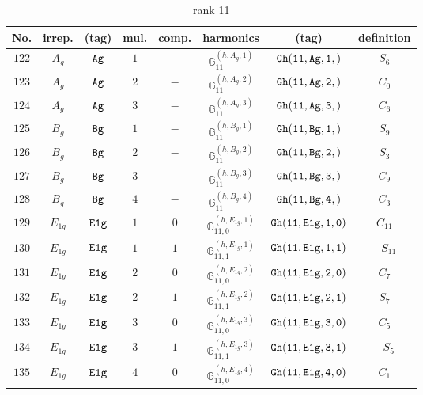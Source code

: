 \documentclass[fleqn,8pt]{jsarticle}
\begin{document}
\begin{table}[ht!]
\begin{center}
\caption{rank 11}
\renewcommand{\arraystretch}{1.3}
\begin{tabular}{cccccccc} \hline \hline
No. & irrep. & (tag) & mul. & comp. & harmonics & (tag) & definition \\ \hline
$ 122 $ & $ A_{g} $ & $ {\tt Ag} $ & $ 1 $ & $ - $ & $ \mathbb{G}_{11}^{(h,A_{g},1)} $ & $ {\tt Gh(11,Ag,1,)} $ & $ S_{6} $ \\
$ 123 $ & $ A_{g} $ & $ {\tt Ag} $ & $ 2 $ & $ - $ & $ \mathbb{G}_{11}^{(h,A_{g},2)} $ & $ {\tt Gh(11,Ag,2,)} $ & $ C_{0} $ \\
$ 124 $ & $ A_{g} $ & $ {\tt Ag} $ & $ 3 $ & $ - $ & $ \mathbb{G}_{11}^{(h,A_{g},3)} $ & $ {\tt Gh(11,Ag,3,)} $ & $ C_{6} $ \\
$ 125 $ & $ B_{g} $ & $ {\tt Bg} $ & $ 1 $ & $ - $ & $ \mathbb{G}_{11}^{(h,B_{g},1)} $ & $ {\tt Gh(11,Bg,1,)} $ & $ S_{9} $ \\
$ 126 $ & $ B_{g} $ & $ {\tt Bg} $ & $ 2 $ & $ - $ & $ \mathbb{G}_{11}^{(h,B_{g},2)} $ & $ {\tt Gh(11,Bg,2,)} $ & $ S_{3} $ \\
$ 127 $ & $ B_{g} $ & $ {\tt Bg} $ & $ 3 $ & $ - $ & $ \mathbb{G}_{11}^{(h,B_{g},3)} $ & $ {\tt Gh(11,Bg,3,)} $ & $ C_{9} $ \\
$ 128 $ & $ B_{g} $ & $ {\tt Bg} $ & $ 4 $ & $ - $ & $ \mathbb{G}_{11}^{(h,B_{g},4)} $ & $ {\tt Gh(11,Bg,4,)} $ & $ C_{3} $ \\
$ 129 $ & $ E_{1g} $ & $ {\tt E1g} $ & $ 1 $ & $ 0 $ & $ \mathbb{G}_{11,0}^{(h,E_{1g},1)} $ & $ {\tt Gh(11,E1g,1,0)} $ & $ C_{11} $ \\
$ 130 $ & $ E_{1g} $ & $ {\tt E1g} $ & $ 1 $ & $ 1 $ & $ \mathbb{G}_{11,1}^{(h,E_{1g},1)} $ & $ {\tt Gh(11,E1g,1,1)} $ & $ - S_{11} $ \\
$ 131 $ & $ E_{1g} $ & $ {\tt E1g} $ & $ 2 $ & $ 0 $ & $ \mathbb{G}_{11,0}^{(h,E_{1g},2)} $ & $ {\tt Gh(11,E1g,2,0)} $ & $ C_{7} $ \\
$ 132 $ & $ E_{1g} $ & $ {\tt E1g} $ & $ 2 $ & $ 1 $ & $ \mathbb{G}_{11,1}^{(h,E_{1g},2)} $ & $ {\tt Gh(11,E1g,2,1)} $ & $ S_{7} $ \\
$ 133 $ & $ E_{1g} $ & $ {\tt E1g} $ & $ 3 $ & $ 0 $ & $ \mathbb{G}_{11,0}^{(h,E_{1g},3)} $ & $ {\tt Gh(11,E1g,3,0)} $ & $ C_{5} $ \\
$ 134 $ & $ E_{1g} $ & $ {\tt E1g} $ & $ 3 $ & $ 1 $ & $ \mathbb{G}_{11,1}^{(h,E_{1g},3)} $ & $ {\tt Gh(11,E1g,3,1)} $ & $ - S_{5} $ \\
$ 135 $ & $ E_{1g} $ & $ {\tt E1g} $ & $ 4 $ & $ 0 $ & $ \mathbb{G}_{11,0}^{(h,E_{1g},4)} $ & $ {\tt Gh(11,E1g,4,0)} $ & $ C_{1} $ \\

\end{tabular}
\end{center}
\end{table}
\end{document}
